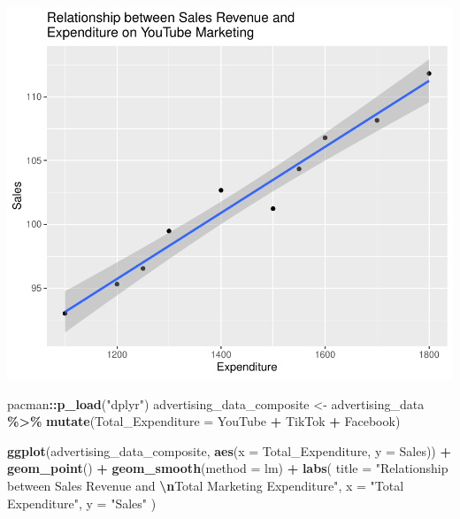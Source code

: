 \documentclass[
]{article}
\newenvironment{Shaded}{\begin{snugshade}}{\end{snugshade}}
\newcommand{\AttributeTok}[1]{\textcolor[rgb]{0.13,0.29,0.53}{#1}}
\newcommand{\FunctionTok}[1]{\textcolor[rgb]{0.13,0.29,0.53}{\textbf{#1}}}
\newcommand{\NormalTok}[1]{#1}
\newcommand{\OtherTok}[1]{\textcolor[rgb]{0.56,0.35,0.01}{#1}}
\newcommand{\SpecialCharTok}[1]{\textcolor[rgb]{0.81,0.36,0.00}{\textbf{#1}}}
\newcommand{\StringTok}[1]{\textcolor[rgb]{0.31,0.60,0.02}{#1}}
\begin{document}
\includegraphics{2_multiple_linear_regression_files/figure-latex/scatter_plot_2-1.pdf}

\begin{Shaded}
\begin{Highlighting}[]
\NormalTok{pacman}\SpecialCharTok{::}\FunctionTok{p\_load}\NormalTok{(}\StringTok{"dplyr"}\NormalTok{)}
\NormalTok{advertising\_data\_composite }\OtherTok{\textless{}{-}}\NormalTok{ advertising\_data }\SpecialCharTok{\%\textgreater{}\%}
  \FunctionTok{mutate}\NormalTok{(}\AttributeTok{Total\_Expenditure =}\NormalTok{ YouTube }\SpecialCharTok{+}\NormalTok{ TikTok }\SpecialCharTok{+}\NormalTok{ Facebook)}

\FunctionTok{ggplot}\NormalTok{(advertising\_data\_composite,}
       \FunctionTok{aes}\NormalTok{(}\AttributeTok{x =}\NormalTok{ Total\_Expenditure, }\AttributeTok{y =}\NormalTok{ Sales)) }\SpecialCharTok{+}
  \FunctionTok{geom\_point}\NormalTok{() }\SpecialCharTok{+}
  \FunctionTok{geom\_smooth}\NormalTok{(}\AttributeTok{method =}\NormalTok{ lm) }\SpecialCharTok{+}
  \FunctionTok{labs}\NormalTok{(}
    \AttributeTok{title =} \StringTok{"Relationship between Sales Revenue and }\SpecialCharTok{\textbackslash{}n}\StringTok{Total Marketing Expenditure"}\NormalTok{,}
    \AttributeTok{x =} \StringTok{"Total Expenditure"}\NormalTok{,}
    \AttributeTok{y =} \StringTok{"Sales"}
\NormalTok{  )}
\end{Highlighting}
\end{Shaded}
\end{document}
